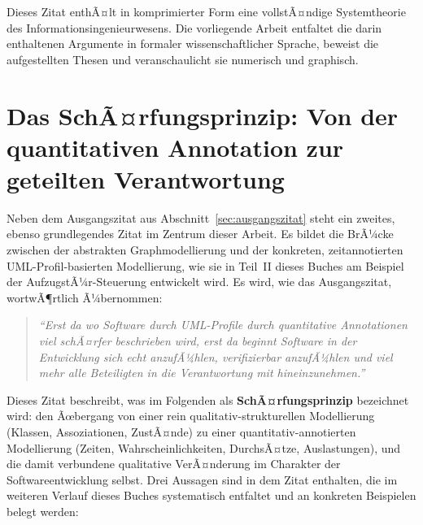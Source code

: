 ﻿\documentclass[a4paper,12pt]{report}
\theoremstyle{definition}
\begin{document}
\noindent
Dieses Zitat enthÃ¤lt in komprimierter Form eine vollstÃ¤ndige Systemtheorie des
Informationsingenieurwesens. Die vorliegende Arbeit entfaltet die darin enthaltenen
Argumente in formaler wissenschaftlicher Sprache, beweist die aufgestellten Thesen und
veranschaulicht sie numerisch und graphisch.

\section{Das SchÃ¤rfungsprinzip: Von der quantitativen Annotation zur geteilten Verantwortung}
\label{sec:schaerfungsprinzip}

Neben dem Ausgangszitat aus Abschnitt~\ref{sec:ausgangszitat} steht ein zweites,
ebenso grundlegendes Zitat im Zentrum dieser Arbeit. Es bildet die BrÃ¼cke zwischen
der abstrakten Graphmodellierung und der konkreten, zeitannotierten
UML-Profil-basierten Modellierung, wie sie in Teil~II dieses Buches am Beispiel der
AufzugstÃ¼r-Steuerung entwickelt wird. Es wird, wie das Ausgangszitat, wortwÃ¶rtlich
Ã¼bernommen:

\begin{quotation}
\noindent\textit{%
``Erst da wo Software durch UML-Profile durch quantitative Annotationen
viel schÃ¤rfer beschrieben wird, erst da beginnt Software in der Entwicklung
sich echt anzufÃ¼hlen, verifizierbar anzufÃ¼hlen und viel mehr alle
Beteiligten in die Verantwortung mit hineinzunehmen.''
}
\end{quotation}

\noindent
Dieses Zitat beschreibt, was im Folgenden als \textbf{SchÃ¤rfungsprinzip} bezeichnet
wird: den Ãœbergang von einer rein qualitativ-strukturellen Modellierung (Klassen,
Assoziationen, ZustÃ¤nde) zu einer quantitativ-annotierten Modellierung (Zeiten,
Wahrscheinlichkeiten, DurchsÃ¤tze, Auslastungen), und die damit verbundene qualitative
VerÃ¤nderung im Charakter der Softwareentwicklung selbst. Drei Aussagen sind in dem
Zitat enthalten, die im weiteren Verlauf dieses Buches systematisch entfaltet und an
konkreten Beispielen belegt werden:
\end{document}
